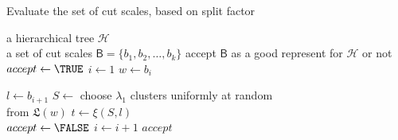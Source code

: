 \begin{algorithm}[h!]
\caption{Evaluate the set of cut scales, based on split factor}\label{alg:evaluate}
\begin{algorithmic}[1]
	\REQUIRE a hierarchical tree $\mathcal{H}$ \AND \\
             \hspace{8 mm} a set of cut scales $\textit{$\mathsf{B}$} = \{b_1, b_2, \ldots, b_k\}$
	\ENSURE accept \textit{$\mathsf{B}$} as a good represent for $\mathcal{H}$ or not
	\medskip
	\STATE $accept \leftarrow \TRUE$ 
	\STATE $i \leftarrow 1$
		\vspace{1.4mm}
		\STATE $w \leftarrow b_i$

		\STATE $l \leftarrow b_{i+1}$
		\vspace{1.6mm}
		\STATE $ S \leftarrow$ choose $\lambda_1$ clusters uniformly at random \\
								\hspace{8mm} from $\mathfrak{L}$$(w)$
		\vspace{1.6mm}
		\STATE $t \leftarrow \xi(S,l)$ \\
		\vspace{1.6mm}
			\vspace{1.3mm}	
			\STATE $accept \leftarrow \FALSE$ 
		\ENDIF
		\vspace{1.5mm}
		\STATE $i \leftarrow i+1$\;	
	\ENDWHILE
	\vspace{1.5mm}
	\RETURN $accept$
\end{algorithmic}
\end{algorithm}
